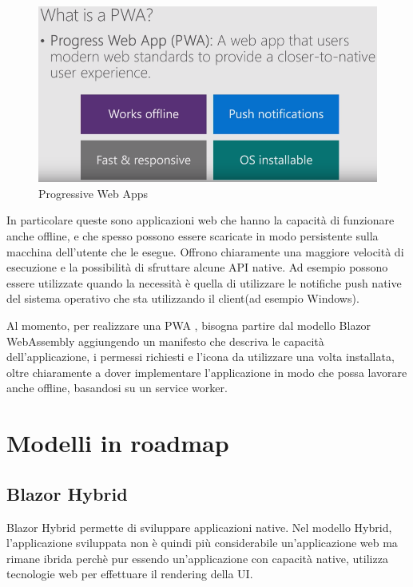 \begin{figure}[H]
	\centerline{\includegraphics[scale=0.5]{figure/ProgressiveWebApp.png}}
	\caption{Progressive Web Apps}
	\label{fig:WhatIsAPWA}
\end{figure}

In particolare queste sono applicazioni web che hanno la capacit\`a di funzionare anche offline, e che spesso possono essere scaricate in modo persistente sulla macchina dell'utente che le esegue.
Offrono chiaramente una maggiore velocit\`a di esecuzione e la possibilit\`a di sfruttare alcune API native.
Ad esempio possono essere utilizzate quando la necessit\`a \`e quella di utilizzare le notifiche push native del sistema operativo che sta utilizzando il client(ad esempio Windows).

Al momento, per realizzare una PWA , bisogna partire dal modello Blazor WebAssembly aggiungendo un manifesto che descriva le capacit\`a dell'applicazione, i permessi richiesti e l'icona da utilizzare una volta installata, oltre chiaramente a dover implementare l'applicazione in modo che possa lavorare anche offline, basandosi su un service worker\cite{blazorPWA}.
\pagebreak

\section{Modelli in roadmap}
\subsection{Blazor Hybrid}\label{sez:bhybrid}
Blazor Hybrid permette di sviluppare applicazioni native.
Nel modello Hybrid, l'applicazione sviluppata non \`e quindi pi\`u considerabile un'applicazione web ma rimane ibrida perch\`e pur essendo un'applicazione con capacit\`a native, utilizza tecnologie web per effettuare il rendering della UI.

